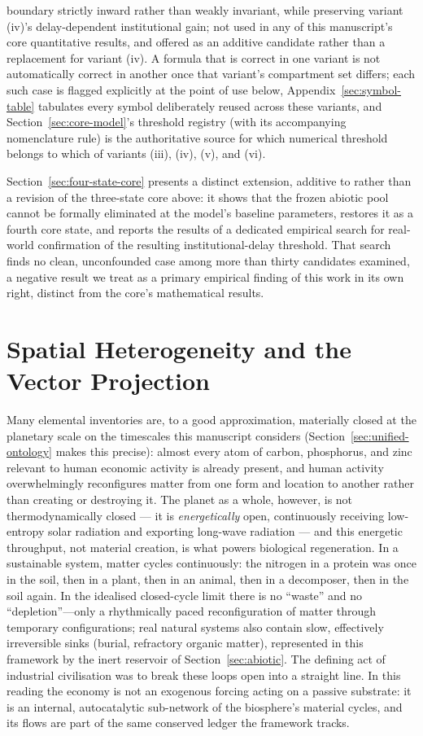 \documentclass[twocolumn,10pt]{article}
\begin{document}
boundary strictly inward rather than weakly invariant, while preserving variant (iv)'s delay-dependent institutional gain; not used in any of this manuscript's core quantitative results, and offered as an additive candidate rather than a replacement for variant (iv). A formula that is correct in one variant is not automatically correct in another once that variant's compartment set differs; each such case is flagged explicitly at the point of use below, Appendix~\ref{sec:symbol-table} tabulates every symbol deliberately reused across these variants, and Section~\ref{sec:core-model}'s threshold registry (with its accompanying nomenclature rule) is the authoritative source for which numerical threshold belongs to which of variants (iii), (iv), (v), and (vi).

Section~\ref{sec:four-state-core} presents a distinct extension, additive to rather than a revision of the three-state core above: it shows that the frozen abiotic pool cannot be formally eliminated at the model's baseline parameters, restores it as a fourth core state, and reports the results of a dedicated empirical search for real-world confirmation of the resulting institutional-delay threshold. That search finds no clean, unconfounded case among more than thirty candidates examined, a negative result we treat as a primary empirical finding of this work in its own right, distinct from the core's mathematical results.

\section{Spatial Heterogeneity and the Vector Projection}
\label{sec:spatial-heterogeneity}
Many elemental inventories are, to a good approximation, materially closed at the planetary scale on the timescales this manuscript considers (Section~\ref{sec:unified-ontology} makes this precise): almost every atom of carbon, phosphorus, and zinc relevant to human economic activity is already present, and human activity overwhelmingly reconfigures matter from one form and location to another rather than creating or destroying it. The planet as a whole, however, is not thermodynamically closed --- it is \emph{energetically} open, continuously receiving low-entropy solar radiation and exporting long-wave radiation --- and this energetic throughput, not material creation, is what powers biological regeneration. In a sustainable system, matter cycles continuously: the nitrogen in a protein was once in the soil, then in a plant, then in an animal, then in a decomposer, then in the soil again. In the idealised closed-cycle limit there is no ``waste'' and no ``depletion''---only a rhythmically paced reconfiguration of matter through temporary configurations; real natural systems also contain slow, effectively irreversible sinks (burial, refractory organic matter), represented in this framework by the inert reservoir of Section~\ref{sec:abiotic}. The defining act of industrial civilisation was to break these loops open into a straight line. In this reading the economy is not an exogenous forcing acting on a passive substrate: it is an internal, autocatalytic sub-network of the biosphere's material cycles, and its flows are part of the same conserved ledger the framework tracks.
\end{document}
